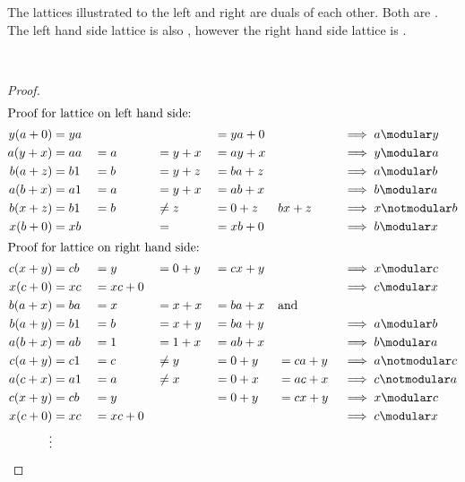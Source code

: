 \hfill%
\begin{minipage}{\tw-46mm}%
\begin{example}
\label{ex:latm_7}
The lattices illustrated to the left and right are duals of each other.
Both are .
The left hand side lattice is also ,
however the right hand side lattice is .\footnotemark
\end{example}
\end{minipage}\hfill%
%
\hfill{}\\
\begin{proof}
\begin{align*}
  \intertext{Proof for lattice on left hand side:}
    y(a+0) &= ya &&       &&        &&= ya+0 &&            && \implies a\modular y\\
    a(y+x) &= aa &&= a    &&= y+x   &&= ay+x &&            && \implies y\modular a \\
    b(a+z) &= b1 &&= b    &&= y+z   &&= ba+z &&            && \implies a\modular b \\
    a(b+x) &= a1 &&= a    &&= y+x   &&= ab+x &&            && \implies b\modular a \\
    b(x+z) &= b1 &&= b    &&\ne  z &&= 0+z  && bx+z       && \implies x\notmodular b \\
    x(b+0) &= xb &&       &&=       &&= xb+0 &&            && \implies b\modular x \\
  \intertext{Proof for lattice on right hand side:}
    c(x+y) &= cb &&= y    &&= 0+y   &&= cx+y &&            && \implies x\modular c \\
    x(c+0) &= xc &&= xc+0 &&        &&       &&            && \implies c\modular x \\
    b(a+x) &= ba &&= x    &&= x+x   &&= ba+x && \text{and} && \\
    b(a+y) &= b1 &&= b    &&= x+y   &&= ba+y &&            && \implies a\modular b\\
    a(b+x) &= ab &&= 1    &&= 1+x   &&= ab+x &&            && \implies b\modular a\\
    c(a+y) &= c1 &&= c    &&\ne  y &&= 0+y  &&= ca + y    && \implies a\notmodular c \\
    a(c+x) &= a1 &&= a    &&\ne  x &&= 0+x  &&= ac + x    && \implies c\notmodular a \\
    c(x+y) &= cb &&= y    &&        &&= 0+y  &&= cx+y      && \implies x\modular c \\
    x(c+0) &= xc &&= xc+0 &&        &&       &&            && \implies c\modular x
    \\\vdots
\end{align*}
\end{proof}



